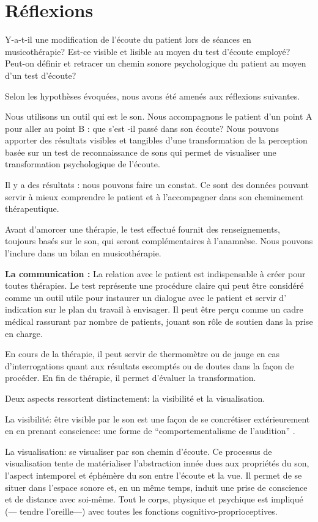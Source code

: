 
\chapter{Réflexions}


Y-a-t-il une modification de l'écoute du patient lors de séances en musicothérapie?
Est-ce visible et lisible au moyen du test d'écoute employé?
Peut-on définir et retracer un chemin sonore psychologique du patient au moyen d'un test d'écoute?


Selon les hypothèses évoquées, nous avons été amenés aux réflexions suivantes.

Nous utilisons un outil qui est le son. Nous accompagnons
le patient d'un point A pour aller au point B : que s'est -il passé
dans son écoute? Nous pouvons apporter des résultats visibles et tangibles 
d'une transformation de la
perception basée sur un test de reconnaissance de sons qui permet de visualiser une transformation psychologique
de l'écoute. 


Il y a des résultats : nous pouvons faire un constat.
Ce sont des données pouvant servir à mieux comprendre le patient
et à l'accompagner dans son cheminement thérapeutique.



  Avant d'amorcer une thérapie, le test effectué fournit des renseignements, toujours basés sur le son, qui seront complémentaires à l'anamnèse. Nous pouvons  l'inclure dans un  bilan en musicothérapie.

\textbf{La communication : } 
	La relation avec le patient est indispensable à créer pour toutes thérapies.
	Le test représente une procédure claire qui peut être considéré comme un outil utile pour instaurer un dialogue avec le patient et servir d' indication sur le plan du travail à envisager. Il peut être perçu comme un cadre médical  rassurant par nombre de patients, jouant son rôle de soutien dans la prise en charge.
  
 
En cours de la thérapie, il peut servir de thermomètre ou de jauge en cas d'interrogations quant aux résultats escomptés ou de doutes dans la façon de procéder.
En fin de thérapie, il permet d'évaluer la transformation.


Deux aspects ressortent distinctement: la visibilité et la visualisation.

La visibilité: être visible par le son est une façon de se concrétiser extérieurement en en prenant conscience: une forme de ``comportementalisme de l'audition'' .


La visualisation: se visualiser par son chemin d'écoute.  
Ce processus de visualisation tente de matérialiser l'abstraction innée dues aux propriétés du son, l'aspect intemporel et éphémère du son entre l'écoute et la vue.
Il permet de se situer dans l'espace sonore et, en un même temps, induit une prise de conscience et de distance avec soi-même. Tout le corps, physique et psychique est impliqué (--- tendre l'oreille---) avec toutes les fonctions cognitivo-proprioceptives.


